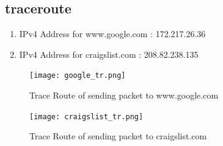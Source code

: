\documentclass[12pt]{article}
\begin{document}
\subsection{traceroute}
\begin{enumerate}
    \item IPv4 Address for www.google.com : 172.217.26.36
    \item IPv4 Address for craigslist.com : 208.82.238.135
\end{enumerate}

\begin{figure}[h!]
    \centering
    \texttt{[image: google\_tr.png]}
    \caption{Trace Route of sending packet to www.google.com}
\end{figure}

\begin{figure}[h!]
    \centering
    \texttt{[image: craigslist\_tr.png]}
    \caption{Trace Route of sending packet to craigslist.com}
\end{figure}
\renewcommand{\labelenumi}{\Alph{enumi}}
\end{document}
